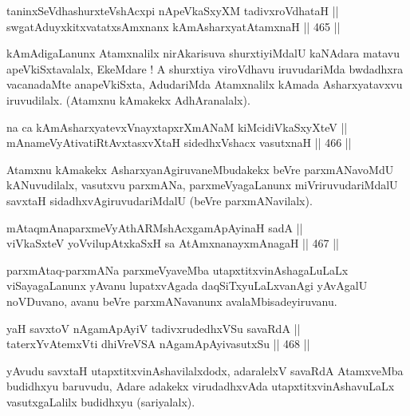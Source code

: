 \begin{shl}
taninxSeVdhashurxteVshAcxpi nApeVkaSxyXM tadivxroVdhataH || \\
swgatAduyxkitxvatatxsAmxnanx kAmAsharxyatA\s \s tamxnaH \hfill || 465 ||  
\end{shl}

\begin{artha}
kAmAdigaLanunx Atamxnalilx nirAkarisuva shurxtiyiMdalU kaNAdara matavu
apeVkiSxtavalalx, EkeMdare ! A shurxtiya viroVdhavu iruvudariMda
bwdadhxra vacanadaMte anapeVkiSxta, AdudariMda Atamxnalilx kAmada
Asharxyatavxvu iruvudilalx. (Atamxnu kAmakekx AdhAranalalx).
\end{artha}

\begin{shl}
na ca kAmAsharxyatevxV\s nayxtapxrXmANaM kiMcidiVkaSxyXteV || \\
mAnameVyAtivatiRtAvxtasxvXtaH sidedhxVshacx vasutxnaH \hfill || 466 ||  
\end{shl}

\begin{artha}
Atamxnu kAmakekx AsharxyanAgiruvaneMbudakekx beVre parxmANa\-\break voMdU
kANuvudilalx, vasutxvu parxmANa, parxmeVyagaLanunx miVriruvudariMdalU
savxtaH sidadhxvAgiruvudariMdalU (beVre parxmANavilalx).
\end{artha}

\begin{shl}
mAtaqmAnaparxmeVyAthARMshAcx\s \s gamApAyinaH sadA || \\
viVkaSxteV yoV\s vilupAtxkaSxH sa AtAmx\s nanayxmAnagaH \hfill || 467 ||  
\end{shl}

\begin{artha}
parxmAtaq-parxmANa parxmeVyaveMba utapxtitxvinAshagaLuLaLx
viSayagaLanunx yAvanu lupatxvAgada daqSiTxyuLaLxvanAgi yAvAgalU
noVDuvano, avanu beVre parxmANavanunx avalaMbisadeyiruvanu.
\end{artha}

\begin{shl}
yaH savxtoV nA\s \s gamApAyiV tadivxrudedhxVSu savaRdA || \\
taterxYvA\s \s temxVti dhiVreVSA nA\s \s gamApAyivasutxSu \hfill || 468 ||  
\end{shl}

\begin{artha}
yAvudu savxtaH utapxtitxvinAshavilalxdodx, adaralelxV savaRdA
AtamxveMba budidhxyu baruvudu, Adare adakekx virudadhxvAda
utapxtitxvinAshavuLaLx vasutxgaLalilx budidhxyu (sariyalalx).
\end{artha} 

